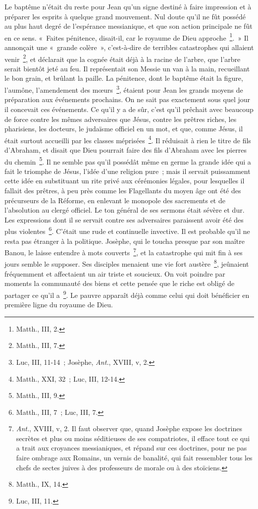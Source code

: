 \documentclass[french,twoside]{book} %
\begin{document}
Le baptême n’était du reste pour Jean qu’un signe destiné à faire impression et à préparer les esprits à quelque grand mouvement. Nul doute qu’il ne fût possédé au plus haut degré de l’espérance messianique, et que son action principale ne fût en ce sens. « Faites pénitence, disait-il, car le royaume de Dieu approche \footnote{Matth., III, 2.}. » Il annonçait une « grande colère », c’est-à-dire de terribles catastrophes qui allaient venir \footnote{Matth., III, 7.}, et déclarait que la cognée était déjà à la racine de l’arbre, que l’arbre serait bientôt jeté au feu. Il représentait son Messie un van à la main, recueillant le bon grain, et brûlant la paille. La pénitence, dont le baptême était la figure, l’aumône, l’amendement des mœurs \footnote{ Luc, III, 11-14 ; Josèphe, {\itshape Ant.}, XVIII, v, 2.}, étaient pour Jean les grands moyens de préparation aux événements prochains. On ne sait pas exactement sous quel jour il concevait ces événements. Ce qu’il y a de sûr, c’est qu’il prêchait avec beaucoup de force contre les mêmes adversaires que Jésus, contre les prêtres riches, les pharisiens, les docteurs, le judaïsme officiel en un mot, et que, comme Jésus, il était surtout accueilli par les classes méprisées \footnote{Matth., XXI, 32 ; Luc, III, 12-14.}. Il réduisait à rien le titre de fils d’Abraham, et disait que Dieu pourrait faire des fils d’Abraham avec les pierres du chemin \footnote{Matth., III, 9.}. Il ne semble pas qu’il possédât même en germe la grande idée qui a fait le triomphe de Jésus, l’idée d’une religion pure ; mais il servait puissamment cette idée en substituant un rite privé aux cérémonies légales, pour lesquelles il fallait des prêtres, à peu près comme les Flagellants du moyen âge ont été des précurseurs de la Réforme, en enlevant le monopole des sacrements et de l’absolution au clergé officiel. Le ton général de ses sermons était sévère et dur. Les expressions dont il se servait contre ses adversaires paraissent avoir été des plus violentes \footnote{Matth., III, 7 ; Luc, III, 7.}. C’était une rude et continuelle invective. Il est probable qu’il ne resta pas étranger à la politique. Josèphe, qui le toucha presque par son maître Banou, le laisse entendre à mots couverts \footnote{{\itshape Ant.}, XVIII, v, 2. Il faut observer que, quand Josèphe expose les doctrines secrètes et plus ou moins séditieuses de ses compatriotes, il efface tout ce qui a trait aux croyances messianiques, et répand sur ces doctrines, pour ne pas faire ombrage aux Romains, un vernis de banalité, qui fait ressembler tous les chefs de sectes juives à des professeurs de morale ou à des stoïciens.}, et la catastrophe qui mit fin à ses jours semble le supposer. Ses disciples menaient une vie fort austère \footnote{Matth., IX, 14.}, jeûnaient fréquemment et affectaient un air triste et soucieux. On voit poindre par moments la communauté des biens et cette pensée que le riche est obligé de partager ce qu’il a \footnote{Luc, III, 11.}. Le pauvre apparaît déjà comme celui qui doit bénéficier en première ligne du royaume de Dieu.\par
\end{document}
